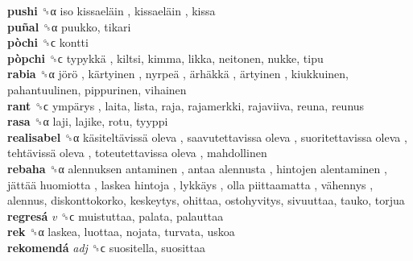 \textbf{pushi} ␝α   iso kissaeläin ,  kissaeläin , kissa  \\
\textbf{puñal} ␝α  puukko, tikari  \\
\textbf{pòchi} ␝ϲ  kontti  \\
\textbf{pòpchi} ␝ϲ   typykkä , kiltsi, kimma, likka, neitonen, nukke, tipu  \\
\textbf{rabia} ␝α   jörö ,  kärtyinen ,  nyrpeä ,  ärhäkkä ,  ärtyinen , kiukkuinen, pahantuulinen, pippurinen, vihainen  \\
\textbf{rant} ␝ϲ   ympärys , laita, lista, raja, rajamerkki, rajaviiva, reuna, reunus  \\
\textbf{rasa} ␝α  laji, lajike, rotu, tyyppi  \\
\textbf{realisabel} ␝α   käsiteltävissä oleva ,  saavutettavissa oleva ,  suoritettavissa oleva ,  tehtävissä oleva ,  toteutettavissa oleva , mahdollinen  \\
\textbf{rebaha} ␝α   alennuksen antaminen ,  antaa alennusta ,  hintojen alentaminen ,  jättää huomiotta ,  laskea hintoja ,  lykkäys ,  olla piittaamatta ,  vähennys , alennus, diskonttokorko, keskeytys, ohittaa, ostohyvitys, sivuuttaa, tauko, torjua  \\
\textbf{regresá} \emph{v}  ␝ϲ  muistuttaa, palata, palauttaa  \\
\textbf{rek} ␝α  laskea, luottaa, nojata, turvata, uskoa  \\
\textbf{rekomendá} \emph{adj}  ␝ϲ  suositella, suosittaa  \\

